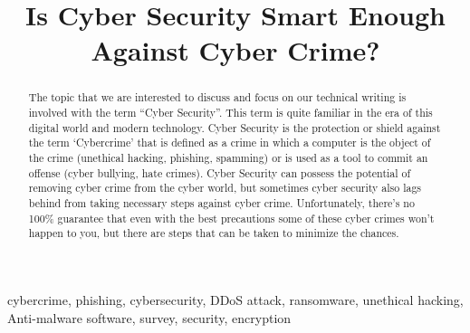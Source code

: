 \documentclass[conference,double column]{IEEEtran}
\begin{document}
	\title{Is Cyber Security Smart Enough Against Cyber Crime?}
	\author{}
	
	\maketitle
	
	
	\begin{abstract}
		The topic that we are interested to discuss and focus on our technical writing is involved with the term “Cyber Security”. This term is quite familiar in the era of this digital world and modern technology. Cyber Security is the protection or shield against the term ‘Cybercrime’ that is defined as a crime in which a computer is the object of the crime (unethical hacking, phishing, spamming) or is used as a tool to commit an offense (cyber bullying, hate crimes). Cyber Security can possess the potential of removing cyber crime from the cyber world, but sometimes cyber security also lags behind from taking necessary steps against cyber crime. Unfortunately, there's no 100\% guarantee that even with the best precautions some of these cyber crimes won't happen to you, but there are steps that can be taken to minimize the chances.
	\end{abstract}
	
	\begin{IEEEkeywords}
		cybercrime, phishing, cybersecurity, DDoS attack, ransomware, unethical hacking, Anti-malware software, survey, security, encryption
	\end{IEEEkeywords}
	
\end{document}
